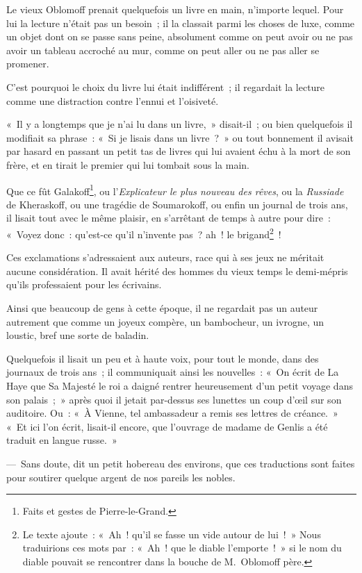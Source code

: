 \documentclass[french,twoside]{book} %
\begin{document}
Le vieux Oblomoff prenait quelquefois un livre en main, n’importe lequel. Pour lui la lecture n’était pas un besoin ; il la classait parmi les choses de luxe, comme un objet dont on se passe sans peine, absolument comme on peut avoir ou ne pas avoir un tableau accroché au mur, comme on peut aller ou ne pas aller se promener.\par
C’est pourquoi le choix du livre lui était indifférent ; il regardait la lecture comme une distraction contre l’ennui et l’oisiveté.\par
« Il y a longtemps que je n’ai lu dans un livre, » disait-il ; ou bien quelquefois il modifiait sa phrase : « Si je lisais dans un livre ? » ou tout bonnement il avisait par hasard en passant un petit tas de livres qui lui avaient échu à la mort de son frère, et en tirait le premier qui lui tombait sous la main.\par
Que ce fût Galakoff\footnote{Faits et gestes de Pierre-le-Grand.}, ou l’\emph{Explicateur le plus nouveau des rêves}, ou la \emph{Russiade} de Kheraskoff, ou une tragédie de Soumarokoff, ou enfin un journal de trois ans, il lisait tout avec le même plaisir, en s’arrêtant de temps à autre pour dire : « Voyez donc : qu’est-ce qu’il n’invente pas ? ah ! le brigand\footnote{Le texte ajoute : « Ah ! qu’il se fasse un vide autour de lui ! » Nous traduirions ces mots par : « Ah ! que le diable l’emporte ! » si le nom du diable pouvait se rencontrer dans la bouche de M. Oblomoff père.} !\par
Ces exclamations s’adressaient aux auteurs, race qui à ses jeux ne méritait aucune considération. Il avait hérité des hommes du vieux temps le demi-mépris qu’ils professaient pour les écrivains.\par
Ainsi que beaucoup de gens à cette époque, il ne regardait pas un auteur autrement que comme un joyeux compère, un bambocheur, un ivrogne, un loustic, bref une sorte de baladin.\par
Quelquefois il lisait un peu et à haute voix, pour tout le monde, dans des journaux de trois ans ; il communiquait ainsi les nouvelles : « On écrit de La Haye que Sa Majesté le roi a daigné rentrer heureusement d’un petit voyage dans son palais ; » après quoi il jetait par-dessus ses lunettes un coup d’œil sur son auditoire. Ou : « À Vienne, tel ambassadeur a remis ses lettres de créance. » « Et ici l’on écrit, lisait-il encore, que l’ouvrage de madame de Genlis a été traduit en langue russe. »\par
— Sans doute, dit un petit hobereau des environs, que ces traductions sont faites pour soutirer quelque argent de nos pareils les nobles.
\end{document}
